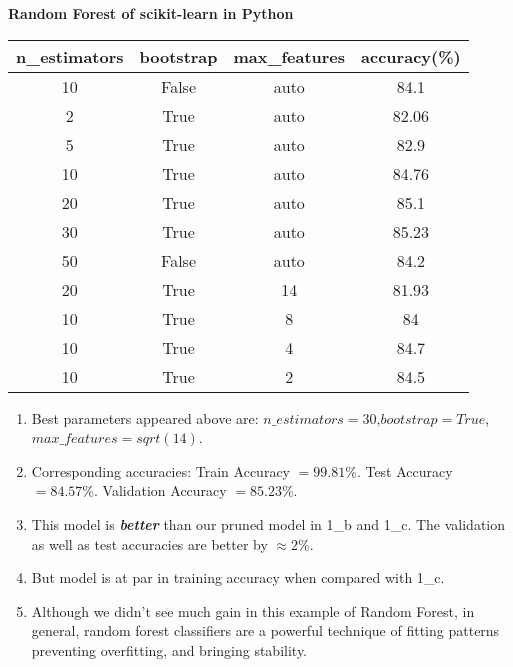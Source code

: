 \documentclass{article}
\newcommand{\bld}[1]{\textbf{#1}}
\newcommand{\italb}[1]{\textbf{\textit{#1}}}
\begin{document}
\bld{Random Forest of scikit-learn in Python}
\begin{center}
 \begin{tabular}{||c|c|c|c||} 
 \hline
 n\_estimators & bootstrap & max\_features & accuracy(\%) \\ [0.5ex] 
 \hline\hline
 10 & False & auto & 84.1\\
 \hline
 2 & True & auto & 82.06\\ 
 \hline
 5 & True & auto & 82.9\\ 
 \hline
 10 & True & auto & 84.76\\ 
 \hline
 20 & True & auto & 85.1\\ 
 \hline
 30 & True & auto & 85.23\\ 
 \hline
 50 & False & auto & 84.2\\ 
 \hline
 20 & True & 14 & 81.93\\
 \hline
 10 & True & 8 & 84\\ 
 \hline
 10 & True & 4 & 84.7\\ 
 \hline
 10 & True & 2 & 84.5\\ 
 \hline
\end{tabular}
\end{center}

\begin{enumerate}
	\item Best parameters appeared above are: $n\_estimators=30$,$bootstrap=True$,$max\_features=sqrt(14)$.
	\item Corresponding accuracies: Train Accuracy $=99.81\%$. Test Accuracy $=84.57\%$. Validation Accuracy $=85.23\%$.
	\item This model is \italb{better} than our pruned model in 1\_b and 1\_c. The validation as well as test accuracies are better by $\approx 2\%$.
	\item But model is at par in training accuracy when compared with 1\_c.
	\item Although we didn't see much gain in this example of Random Forest, in general, random forest classifiers are a powerful technique of fitting patterns preventing overfitting, and bringing stability.
\end{enumerate}
\end{document}
